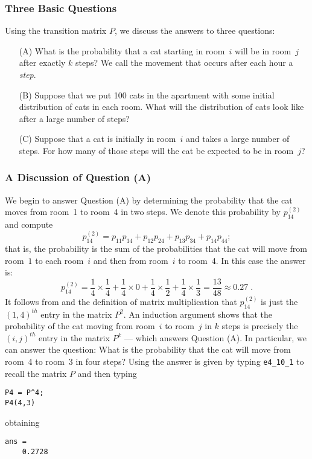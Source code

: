 \documentclass{ximera}
\begin{document}
\subsubsection*{Three Basic Questions}

Using the transition matrix $P$, we discuss the answers to three questions:
\begin{enumerate}
\item[(A)] What is the probability that a cat starting in room~$i$ will
be in room~$j$ after exactly $k$ steps?  We call the movement that occurs
after each hour a {\em step\/}.
\item[(B)] Suppose that we put 100 cats in the apartment with some initial
distribution of cats in each room.  What will the distribution of cats
look like after a large number of steps?
\item[(C)] Suppose that a cat is initially in room~$i$ and takes a large
number of steps.  For how many of those steps will the cat be expected to
be in room~$j$?
\end{enumerate}

\subsubsection*{A Discussion of Question (A)}

We begin to answer Question (A) by determining the probability that the
cat moves from room~1 to room~4 in two steps.  We denote this probability
by $p_{14}^{(2)}$ and compute
\begin{equation} \label{E:prob14}
p_{14}^{(2)} = p_{11}p_{14} + p_{12}p_{24} + p_{13}p_{34} + p_{14}p_{44};
\end{equation}
that is, the probability is the sum of the probabilities that the cat will
move from room~$1$ to each room~$i$ and then from room~$i$ to room~4.  In
this case the answer is:
\[
p_{14}^{(2)} = \frac{1}{4}\times\frac{1}{4} + \frac{1}{4}\times0 +
\frac{1}{4}\times\frac{1}{2} + \frac{1}{4}\times\frac{1}{3} =
\frac{13}{48} \approx 0.27\;.
\]
It follows from  and the definition of matrix multiplication
that $p_{14}^{(2)}$ is just the $(1,4)^{th}$ entry in the matrix $P^2$.  An
induction argument shows that the probability of the cat moving from
room~$i$ to room~$j$ in $k$ steps is precisely the $(i,j)^{th}$ entry in the
matrix $P^k$ --- which answers Question (A).  In particular, we can answer the
question: What is the probability that the cat will move from room~4 to room~3
in four steps?  Using \Matlab the answer is given by typing {\tt e4\_10\_1} to
recall the matrix $P$ and then typing
\begin{verbatim}
P4 = P^4;
P4(4,3)
\end{verbatim}
obtaining
\begin{verbatim}
ans =
    0.2728
\end{verbatim}
\end{document}
